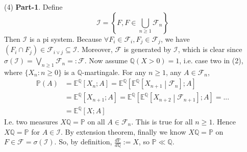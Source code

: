 \documentclass[a4paper,12pt,twoside]{book}
\begin{document}
\begin{itemize}
\begin{itemize}
	(4) \textbf{Part-1}. Define
	\begin{equation}
		\mathcal{I}=\left\{F, F\in \bigcup_{n\geq 1}\mathcal{F}_n\right\}
	\end{equation}
	Then $\mathcal{I}$ is a pi system. Because $\forall F_i\in \mathcal{F}_i, F_j \in \mathcal{F}_j$, we have $(F_i \cap F_j) \in \mathcal{F}_{i \vee j}\subseteq \mathcal{I}$. Moreover, $\mathcal{F}$ is generated by $\mathcal{I}$, which is clear since $\sigma(\mathcal{I})=\bigvee_{n\geq 1} \mathcal{F}_n =: \mathcal{F}$.\newline
	Now assume $\mathbb{Q}(X>0)=1$, i.e. case two in (2), where $\{X_n: n\geq 0\}$ is a $\mathbb{Q}$-martingale. \newline
	For any $n\geq 1$, any $A\in \mathcal{F}_n$,
	\begin{equation}
		\begin{split}
			\mathbb{P}(A)&=\mathbb{E}^{\mathbb{Q}}\left[X_n; A\right]=\mathbb{E}^{\mathbb{Q}}\left[\mathbb{E}^{\mathbb{Q}}\left[X_{n+1}\middle|\mathcal{F}_n\right] ;A\right]\\
			&=\mathbb{E}^{\mathbb{Q}}\left[X_{n+1};A\right]=\mathbb{E}^{\mathbb{Q}}\left[\mathbb{E}^{\mathbb{Q}}\left[X_{n+2}\middle|\mathcal{F}_{n+1}\right] ;A\right]=...\\
			&=\mathbb{E}^{\mathbb{Q}}\left[X;A\right]
		\end{split}
	\end{equation}
	I.e. two measures $X \mathbb{Q}=\mathbb{P}$ on all $A \in \mathcal{F}_n$. This is true for all $n\geq 1$. Hence $X \mathbb{Q}=\mathbb{P}$ for $A\in \mathcal{I}$. By extension theorem, finally we know $X\mathbb{Q}=\mathbb{P}$ on $F\in \mathcal{F}=\sigma(\mathcal{I})$.\newline
	So, by definition, $\frac{d\mathbb{P}}{d \mathbb{Q}}:=X$, so $\mathbb{P} \ll \mathbb{Q}$.\newline


\end{itemize}
\end{itemize}
\end{document}
